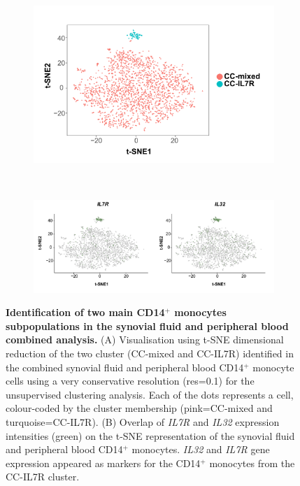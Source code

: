 \bigskip
\begin{figure}[H]
\centering
\begin{subfigure}[b]{0.60\textwidth}
\centering 
\includegraphics[width=\textwidth]{./Results3/pdfs/PSA_scRNAseq_tSNE_CC_mixed_and_IL7R}
\caption{}
\end{subfigure}
~
\begin{subfigure}[b]{0.75\textwidth} 
\centering
\includegraphics[width=\textwidth]{./Results3/pdfs/PSA_scRNAseq_CC_mixed_and_IL7R_overlay_markers}
\caption{}
\end{subfigure}
\caption[Identification of two main CD14$^+$ monocytes subpopulations in the synovial fluid and peripheral blood combined analysis]{\textbf{Identification of two main CD14$^+$ monocytes subpopulations in the synovial fluid and peripheral blood combined analysis.} (A) Visualisation using t-SNE dimensional reduction of the two cluster (CC-mixed and CC-IL7R) identified in the combined synovial fluid and peripheral blood CD14$^+$ monocyte cells using a very conservative resolution (res=0.1) for the unsupervised clustering analysis. Each of the dots represents a cell, colour-coded by the cluster membership (pink=CC-mixed and turquoise=CC-IL7R). (B) Overlap of \textit{IL7R} and \textit{IL32} expression intensities (green) on the t-SNE representation of the synovial fluid and peripheral blood CD14$^+$ monocytes. \textit{IL32} and \textit{IL7R} gene expression appeared as markers for the CD14$^+$ monocytes from the CC-IL7R cluster.}
\label{figure:PsA_scRNAseq_SF_an_PB_monocytes_identification_from_bulk}
\end{figure}

